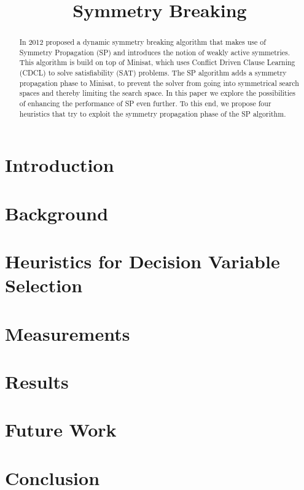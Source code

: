 

\title{Symmetry Breaking}


	\maketitle

	\listoftodos

	\begin{abstract}
	In 2012 \cite{devriendt2012symmetry} proposed a dynamic symmetry breaking algorithm that makes use of Symmetry Propagation (SP) and introduces the notion of weakly active symmetries. This algorithm is build on top of Minisat, which uses Conflict Driven Clause Learning (CDCL) to solve satisfiability (SAT) problems. The SP algorithm adds a symmetry propagation phase to Minisat, to prevent the solver from going into symmetrical search spaces and thereby limiting the search space. In this paper we explore the possibilities of enhancing the performance of SP even further. To this end, we propose four heuristics that try to exploit the symmetry propagation phase of the SP algorithm.
		
	\end{abstract}

	\section{Introduction}
		\label{sec:Introduction}
		

	\section{Background}
		\label{sec:Background}
		

	\section{Heuristics for Decision Variable Selection}
		\label{sec:DecisionVars}
		

	\section{Measurements}
		\label{sec:measurements}
		

	\section{Results}
		\label{sec:Results}
		

		
		

	\section{Future Work}
		\label{sec:FutureWork}
		

	\section{Conclusion}
		\label{sec:Conclusion}
		

	\newpage
	
	

